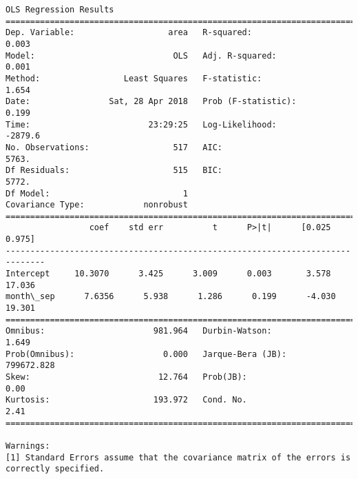 \documentclass[11pt]{article}
\begin{document}
\begin{Verbatim}[commandchars=\\\{\}]
                            OLS Regression Results                            
==============================================================================
Dep. Variable:                   area   R-squared:                       0.003
Model:                            OLS   Adj. R-squared:                  0.001
Method:                 Least Squares   F-statistic:                     1.654
Date:                Sat, 28 Apr 2018   Prob (F-statistic):              0.199
Time:                        23:29:25   Log-Likelihood:                -2879.6
No. Observations:                 517   AIC:                             5763.
Df Residuals:                     515   BIC:                             5772.
Df Model:                           1                                         
Covariance Type:            nonrobust                                         
==============================================================================
                 coef    std err          t      P>|t|      [0.025      0.975]
------------------------------------------------------------------------------
Intercept     10.3070      3.425      3.009      0.003       3.578      17.036
month\_sep      7.6356      5.938      1.286      0.199      -4.030      19.301
==============================================================================
Omnibus:                      981.964   Durbin-Watson:                   1.649
Prob(Omnibus):                  0.000   Jarque-Bera (JB):           799672.828
Skew:                          12.764   Prob(JB):                         0.00
Kurtosis:                     193.972   Cond. No.                         2.41
==============================================================================

Warnings:
[1] Standard Errors assume that the covariance matrix of the errors is correctly specified.



\end{Verbatim}
\end{document}

